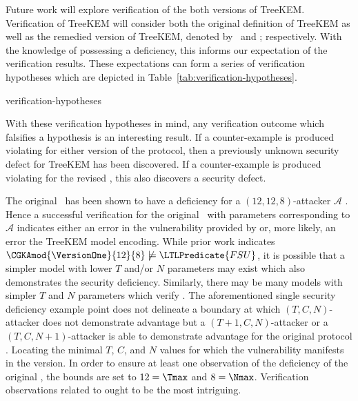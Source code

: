 Future work will explore verification of the both versions of TreeKEM.\@
Verification of TreeKEM will consider both the original definition of TreeKEM as well as the remedied version of TreeKEM, denoted by \VersionOne\ and \VersionTwo; respectively.
With the knowledge of \VersionOne possessing a  deficiency, this informs our expectation of the verification results.
These expectations can form a series of verification hypotheses which are depicted in Table\ \ref{tab:verification-hypotheses}.

\begin{table}[ht!]                                                                                                                      
\caption{%
\label{tab:verification-hypotheses}%
Verification Hypotheses of .
}%
{verification-hypotheses}
\end{table}

With these verification hypotheses in mind, any verification outcome which falsifies a hypothesis is an interesting result.
If a counter-example is produced violating  for either version of the protocol, then a previously unknown security defect for TreeKEM has been discovered.
If a counter-example is produced violating  for the revised \VersionTwo, this also discovers a security defect.

The original \VersionOne\ has been shown to have a  deficiency for a \((12, 12, 8)\)-attacker \(\mathcal{A}\) \autocite{alwen2020security}.
Hence a successful  verification for the original \VersionOne\ with parameters corresponding to \(\mathcal{A}\) indicates either an error in the vulnerability provided by \autocite{alwen2020security} or, more likely, an error the TreeKEM model encoding.
While prior work \autocite{alwen2020security} indicates \( \CGKAmod{\VersionOne}{12}{8} \not \models \LTLPredicate{FSU} \), it is possible that a simpler model with lower \(T\) and/or \(N\) parameters may exist which also demonstrates the  security deficiency.
Similarly, there may be many  models with simpler \(T\) and \(N\) parameters which verify .
The aforementioned single  security deficiency example point does not delineate a boundary at which \((T, C, N)\)-attacker does not demonstrate advantage but a \((T+1, C, N)\)-attacker or a \((T, C, N+1)\)-attacker is able to demonstrate advantage for the original protocol \VersionOne.
Locating the minimal \(T\), \(C\), and \(N\) values for which the vulnerability manifests in the \VersionOne version.
In order to ensure at least one observation of the  deficiency of the original \VersionOne, the bounds are set to \(12 = \Tmax\) and \(8 = \Nmax\).
Verification observations related to  ought to be the most intriguing.

